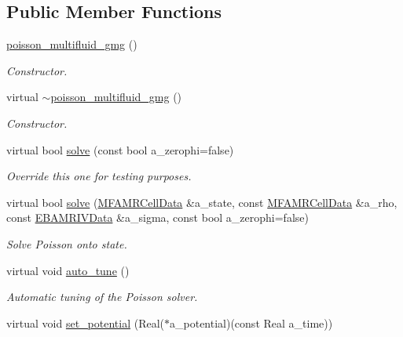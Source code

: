 \subsection*{Public Member Functions}
\begin{DoxyCompactItemize}
\item 
\hyperlink{classpoisson__multifluid__gmg_a6fd8d700ace7267e450af7849c2df878}{poisson\+\_\+multifluid\+\_\+gmg} ()
\begin{DoxyCompactList}\small\item\em Constructor. \end{DoxyCompactList}\item 
virtual \hyperlink{classpoisson__multifluid__gmg_a96089cc2abeafc5e7a3b3e0bd3022936}{$\sim$poisson\+\_\+multifluid\+\_\+gmg} ()
\begin{DoxyCompactList}\small\item\em Constructor. \end{DoxyCompactList}\item 
virtual bool \hyperlink{classpoisson__multifluid__gmg_aa87cb4163e597629dcb7beae8aeb8890}{solve} (const bool a\+\_\+zerophi=false)
\begin{DoxyCompactList}\small\item\em Override this one for testing purposes. \end{DoxyCompactList}\item 
virtual bool \hyperlink{classpoisson__multifluid__gmg_a793239f4afea4116cc22487a35684843}{solve} (\hyperlink{type__definitions_8H_aced885351d40daa466564acbee4042d3}{M\+F\+A\+M\+R\+Cell\+Data} \&a\+\_\+state, const \hyperlink{type__definitions_8H_aced885351d40daa466564acbee4042d3}{M\+F\+A\+M\+R\+Cell\+Data} \&a\+\_\+rho, const \hyperlink{type__definitions_8H_a6b8fa905d55cbb491b52180386f0e0c1}{E\+B\+A\+M\+R\+I\+V\+Data} \&a\+\_\+sigma, const bool a\+\_\+zerophi=false)
\begin{DoxyCompactList}\small\item\em Solve Poisson onto state. \end{DoxyCompactList}\item 
virtual void \hyperlink{classpoisson__multifluid__gmg_a02ad7dee9844f595fd580ca8873bc2ac}{auto\+\_\+tune} ()
\begin{DoxyCompactList}\small\item\em Automatic tuning of the Poisson solver. \end{DoxyCompactList}\item 
virtual void \hyperlink{classpoisson__multifluid__gmg_af6fb6b5afc2fc230dddbd783b0a00eed}{set\+\_\+potential} (Real($\ast$a\+\_\+potential)(const Real a\+\_\+time))

\end{DoxyCompactItemize}
